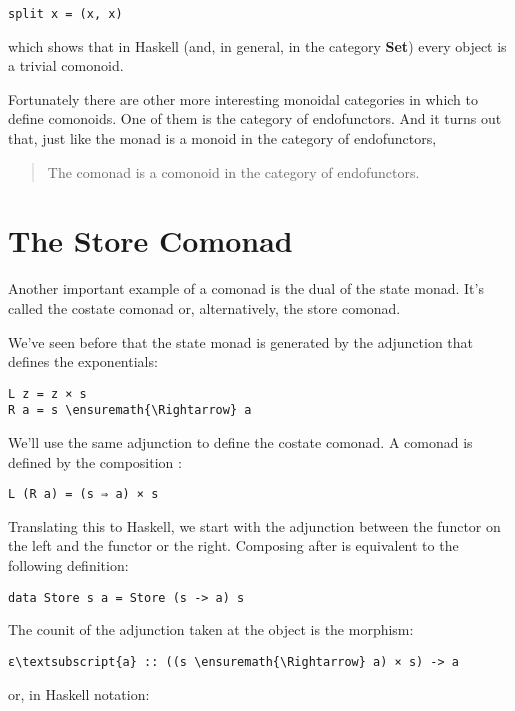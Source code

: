 \begin{Verbatim}[commandchars=\\\{\}]
split x = (x, x)
\end{Verbatim}
which shows that in Haskell (and, in general, in the category
\textbf{Set}) every object is a trivial comonoid.

Fortunately there are other more interesting monoidal categories in
which to define comonoids. One of them is the category of endofunctors.
And it turns out that, just like the monad is a monoid in the category
of endofunctors,

\begin{quote}
The comonad is a comonoid in the category of endofunctors.
\end{quote}

\section{The Store Comonad}\label{the-store-comonad}

Another important example of a comonad is the dual of the state monad.
It's called the costate comonad or, alternatively, the store comonad.

We've seen before that the state monad is generated by the adjunction
that defines the exponentials:

\begin{Verbatim}[commandchars=\\\{\}]
L z = z × s
R a = s \ensuremath{\Rightarrow} a
\end{Verbatim}
We'll use the same adjunction to define the costate comonad. A comonad
is defined by the composition :

\begin{Verbatim}[commandchars=\\\{\}]
L (R a) = (s ⇒ a) × s
\end{Verbatim}
Translating this to Haskell, we start with the adjunction between the
 functor on the left and the  functor or the
right. Composing  after  is equivalent to
the following definition:

\begin{Verbatim}[commandchars=\\\{\}]
data Store s a = Store (s -> a) s
\end{Verbatim}
The counit of the adjunction taken at the object  is the
morphism:

\begin{Verbatim}[commandchars=\\\{\}]
ε\textsubscript{a} :: ((s \ensuremath{\Rightarrow} a) × s) -> a
\end{Verbatim}
or, in Haskell notation:


